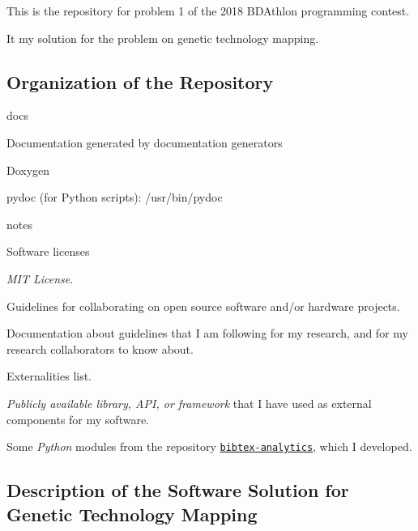 This is the repository for problem 1 of the 2018 B\+D\+Athlon programming contest.

It my solution for the problem on genetic technology mapping.

\subsection*{Organization of the Repository}


\begin{DoxyItemize}
\item docs
\begin{DoxyItemize}
\item Documentation generated by documentation generators
\begin{DoxyItemize}
\item Doxygen
\item pydoc (for Python scripts)\+: /usr/bin/pydoc
\end{DoxyItemize}
\end{DoxyItemize}
\item notes
\begin{DoxyItemize}
\item Software licenses
\begin{DoxyItemize}
\item {\itshape M\+I\+T License}.
\end{DoxyItemize}
\item Guidelines for collaborating on open source software and/or hardware projects.
\item Documentation about guidelines that I am following for my research, and for my research collaborators to know about.
\end{DoxyItemize}
\end{DoxyItemize}

Externalities list.
\begin{DoxyItemize}
\item {\itshape Publicly available library, A\+P\+I, or framework} that I have used as external components for my software.
\begin{DoxyItemize}
\item Some {\itshape Python} modules from the repository \href{https://github.com/eda-ricercatore/bibtex-analytics}{\tt bibtex-\/analytics}, which I developed.
\end{DoxyItemize}
\end{DoxyItemize}

\subsection*{Description of the Software Solution for Genetic Technology Mapping}

